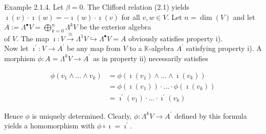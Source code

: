 \documentclass[10pt, letterpaper]{article}
\begin{document}
Example 2.1.4. Let $\beta=0$. The Clifford relation (2.1) yields $\imath(v) \cdot \imath(w)=-\imath(w) \cdot \imath(v)$ for all $v, w \in V$. Let $n=\operatorname{dim}(V)$ and let $A:=\Lambda^{\bullet} V=\bigoplus_{k=0}^{n} \Lambda^{k} V$ be the exterior algebra\\
of $V$. The map $\imath: V \xrightarrow{\cong} \Lambda^{1} V \hookrightarrow \Lambda^{\bullet} V=A$ obviously satisfies property i).\\
Now let $\imath^{\prime}: V \rightarrow A^{\prime}$ be any map from $V$ to a $\mathbb{K}$-algebra $A^{\prime}$ satisfying property i). A morphism $\phi: A=\Lambda^{k} V \rightarrow A^{\prime}$ as in property ii) necessarily satisfies

$$
\begin{aligned}
\phi\left(v_{1} \wedge \ldots \wedge v_{k}\right) & =\phi\left(\imath\left(v_{1}\right) \wedge \ldots \wedge \imath\left(v_{k}\right)\right) \\
& =\phi\left(\imath\left(v_{1}\right)\right) \cdot \ldots \cdot \phi\left(\imath\left(v_{k}\right)\right) \\
& =\imath^{\prime}\left(v_{1}\right) \cdot \ldots \cdot \imath^{\prime}\left(v_{k}\right)
\end{aligned}
$$

Hence $\phi$ is uniquely determined. Clearly, $\phi: \Lambda^{k} V \rightarrow A^{\prime}$ defined by this formula yields a homomorphism with $\phi \circ \imath=\imath^{\prime}$.
\end{document}

